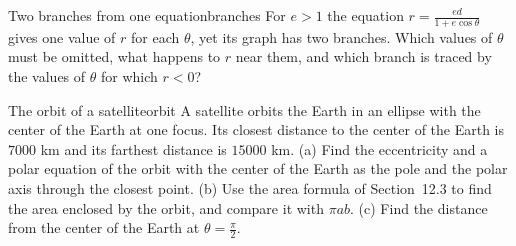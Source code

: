 \documentclass[11pt]{article}
\begin{document}
\begin{think}{Two branches from one equation}{branches}
For $e>1$ the equation $r=\frac{ed}{1+e\cos\theta}$ gives one value of $r$ for each $\theta$, yet its graph has two branches. Which values of $\theta$ must be omitted, what happens to $r$ near them, and which branch is traced by the values of $\theta$ for which $r<0$?
\end{think}

\begin{exmp}{The orbit of a satellite}{orbit}
A satellite orbits the Earth in an ellipse with the center of the Earth at one focus. Its closest distance to the center of the Earth is $7000$ km and its farthest distance is $15000$ km. (a) Find the eccentricity and a polar equation of the orbit with the center of the Earth as the pole and the polar axis through the closest point. (b) Use the area formula of Section~12.3 to find the area enclosed by the orbit, and compare it with $\pi ab$. (c) Find the distance from the center of the Earth at $\theta=\frac\pi2$.


\end{exmp}
\end{document}
